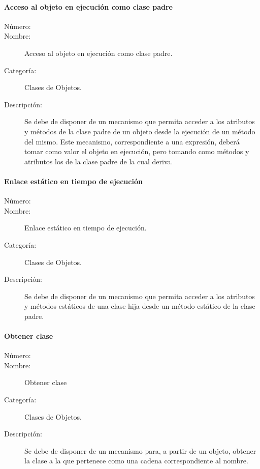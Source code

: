\paragraph{Acceso al objeto en ejecución como clase padre}
	\begin{description}
		\item [Número:] \cn
		\item [Nombre:] Acceso al objeto en ejecución como clase padre.
		\item [Categoría:] Clases de Objetos.
		\item [Descripción:] Se debe de disponer de un mecanismo que permita acceder a los atributos y métodos de la clase padre de un objeto desde 
      la ejecución de un método del mismo. Este mecanismo, correspondiente a una expresión, deberá tomar como valor el objeto en ejecución, pero tomando
      como métodos y atributos los de la clase padre de la cual deriva. 
	\end{description}

\paragraph{Enlace estático en tiempo de ejecución}
	\begin{description}
		\item [Número:] \cn
		\item [Nombre:] Enlace estático en tiempo de ejecución.
		\item [Categoría:] Clases de Objetos.
		\item [Descripción:] Se debe de disponer de un mecanismo que permita acceder a los atributos y métodos estáticos de una clase hija desde un método 
      estático de la clase padre. 
	\end{description}

\paragraph{Obtener clase}
	\begin{description}
		\item [Número:] \cn
		\item [Nombre:] Obtener clase
		\item [Categoría:] Clases de Objetos.
		\item [Descripción:] Se debe de disponer de un mecanismo para, a partir de un objeto, obtener la clase a la que pertenece como una cadena correspondiente al nombre.
	\end{description}


